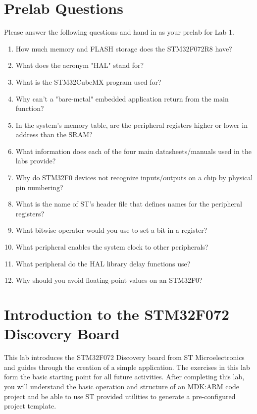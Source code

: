 \documentclass[openany,11pt,fleqn]{book} %
\begin{document}
\section{\color{blue}Prelab Questions}
\begin{question}[Prelab 1]
	Please answer the following questions and hand in as your prelab for Lab 1.
	\begin{enumerate}
		\item How much memory and FLASH storage does the STM32F072R8 have? %
		\item What does the acronym "HAL" stand for? %
		\item What is the STM32CubeMX program used for? %
		\item Why can't a "bare-metal" embedded application return from the main function? %
		\item In the system's memory table, are the peripheral registers higher or lower in address than the SRAM? %
		\item What information does each of the four main datasheets/manuals used in the labs provide? %
		\item Why do STM32F0 devices not recognize inputs/outputs on a chip by physical pin numbering? %
		\item What is the name of ST's header file that defines names for the peripheral registers? %
		\item What bitwise operator would you use to set a bit in a register? %
		\item What peripheral enables the system clock to other peripherals? %
		\item What peripheral do the HAL library delay functions use? %
		\item Why should you avoid floating-point values on an STM32F0? %
	\end{enumerate}
\end{question}

\section{\color{orange}Introduction to the STM32F072 Discovery Board}
This lab introduces the STM32F072 Discovery board from ST Microelectronics and guides through the creation of a simple application. The exercises in this lab form the basic starting point for all future activities. After completing this lab, you will understand the basic operation and structure of an MDK:ARM code project and be able to use ST provided utilities to generate a pre-configured project template. 
\end{document}
